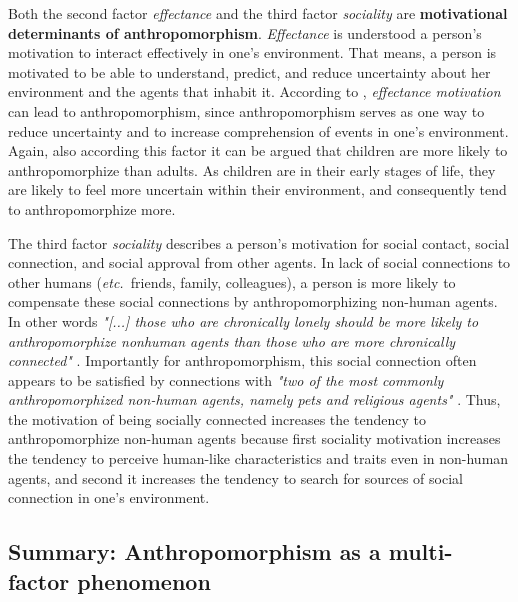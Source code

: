 \documentclass{frontiersSCNS} %
\newcommand{\etc}{{\textit{etc.~}}}
\begin{document}
Both the second factor \textit{effectance} and the third factor \textit{sociality} are \textbf{motivational determinants of anthropomorphism}. \textit{Effectance} is understood a person's motivation to interact effectively in one's environment. That means, a person is motivated to be able to understand, predict, and reduce uncertainty about her environment and the agents that inhabit it. According to \cite{epley_seeing_2007}, \textit{effectance motivation} can lead to anthropomorphism, since anthropomorphism serves as one way to reduce uncertainty and to increase comprehension of events in one's environment. Again, also according this factor it can be argued that children are more likely to anthropomorphize than adults. As children are in their early stages of life, they are likely to feel more uncertain within their environment, and consequently tend to anthropomorphize more.

The third factor \textit{sociality} describes a person's motivation for social contact, social connection, and social approval from other agents. In lack of social connections to other humans (\etc friends, family, colleagues), a person is more likely to compensate these social connections by anthropomorphizing non-human agents. In other words \textit{"[...] those who are chronically lonely should be more likely to anthropomorphize nonhuman agents than those who are more chronically connected"} \citep{epley_seeing_2007}. Importantly for anthropomorphism, this social connection often appears to be satisfied by connections with \textit{"two of the most commonly anthropomorphized non-human agents, namely pets and religious agents"} \citep{epley_seeing_2007}. Thus, the motivation of being socially connected increases the tendency to anthropomorphize non-human agents because first sociality motivation increases the tendency to perceive human-like characteristics and traits even in non-human agents, and second it increases the tendency to search for sources of social connection in one's environment.



  

%
%
%
%
%
%



\subsection{Summary: Anthropomorphism as a multi-factor phenomenon}
\label{sec:multi-factors}
\end{document}
